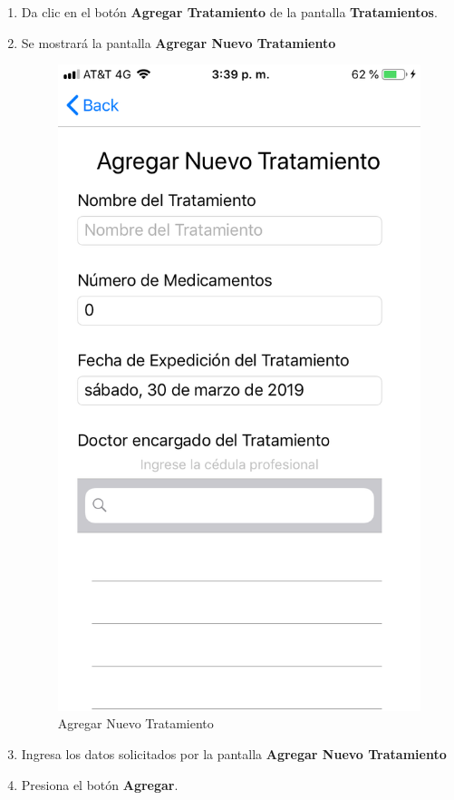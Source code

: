 \begin{enumerate}
	\item Da clic en el botón \textbf{Agregar Tratamiento} de la pantalla \textbf{Tratamientos}.
	
	\item Se mostrará la pantalla \textbf{Agregar Nuevo Tratamiento}
	\newpage
	\begin{figure}[!htbp]			
		\hypertarget{fig:AgregarTratamiento}{\hspace{1pt}}
		\begin{center}
			\includegraphics[height=0.4\textheight]{Paciente/AgregarTratamiento/images/AgregarTratamiento}
			\caption{Agregar Nuevo Tratamiento}
			\label{fig:AgregarTratamiento}
		\end{center}
	\end{figure}

	\item Ingresa los datos solicitados por la pantalla \textbf{Agregar Nuevo Tratamiento}
	
	\item Presiona el botón \textbf{Agregar}.

\end{enumerate}

